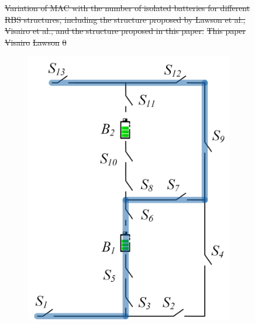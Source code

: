 \documentclass{article}
\providecommand{\DIFdel}[1]{{\protect\color{red}\sout{#1}}}                      %
\providecommand{\DIFdelbegin}{} %
\providecommand{\DIFdelFL}[1]{\DIFdel{#1}} %
\providecommand{\DIFaddbeginFL}{} %
\providecommand{\DIFaddendFL}{} %
\providecommand{\DIFdelbeginFL}{} %
\providecommand{\DIFdelendFL}{} %
\newcommand{\DIFscaledelfig}{0.5}
\newlength{\DIFdelgraphicswidth} %
\newlength{\DIFdelgraphicsheight} %
\newcommand{\DIFaddincludegraphics}[2][]{{\color{blue}\fbox{\DIFOincludegraphics[#1]{#2}}}} %
\newcommand{\DIFdelincludegraphics}[2][]{%
\sbox{\DIFdelgraphicsbox}{\DIFOincludegraphics[#1]{#2}}%
\settoboxwidth{\DIFdelgraphicswidth}{\DIFdelgraphicsbox} %
\settoboxtotalheight{\DIFdelgraphicsheight}{\DIFdelgraphicsbox} %
\scalebox{\DIFscaledelfig}{%
\parbox[b]{\DIFdelgraphicswidth}{\usebox{\DIFdelgraphicsbox}\\[-\baselineskip] \rule{\DIFdelgraphicswidth}{0em}}\llap{\resizebox{\DIFdelgraphicswidth}{\DIFdelgraphicsheight}{%
\setlength{\unitlength}{\DIFdelgraphicswidth}%
\begin{picture}(1,1)%
\thicklines\linethickness{2pt} %
{\color[rgb]{1,0,0}\put(0,0){\framebox(1,1){}}}%
{\color[rgb]{1,0,0}\put(0,0){\line( 1,1){1}}}%
{\color[rgb]{1,0,0}\put(0,1){\line(1,-1){1}}}%
\end{picture}%
}\hspace*{3pt}}} %
} %
\DeclareRobustCommand{\DIFdelbegin}{\DIFOdelbegin \let\includegraphics\DIFdelincludegraphics} %
\DeclareRobustCommand{\DIFaddbeginFL}{\DIFOaddbeginFL \let\includegraphics\DIFaddincludegraphics} %
\DeclareRobustCommand{\DIFaddendFL}{\DIFOaddendFL \let\includegraphics\DIFOincludegraphics} %
\DeclareRobustCommand{\DIFdelbeginFL}{\DIFOdelbeginFL \let\includegraphics\DIFdelincludegraphics} %
\DeclareRobustCommand{\DIFdelendFL}{\DIFOaddendFL \let\includegraphics\DIFOincludegraphics} %
\begin{document}
\DIFdelbegin %
\DIFdelendFL \DIFaddbeginFL \begin{figure}[htbp]
    \DIFaddendFL \centering
    \DIFdelbeginFL %
{%
\DIFdelFL{Variation of MAC with the number of isolated batteries for different RBS structures, including the structure proposed by Lawson et al., Visairo et al., and the structure proposed in this paper.
      }}
\DIFdelFL{This paper  }%
\DIFdelFL{Visairo  }%
\DIFdelFL{Lawson  }%
\DIFdelFL{0     }%
\DIFdelendFL \DIFaddbeginFL \begin{subfigure}[b]{0.27\textwidth}
        \includegraphics[width=\textwidth]{e2f1-mac.png}

\end{subfigure}
\end{figure}
\end{document}
